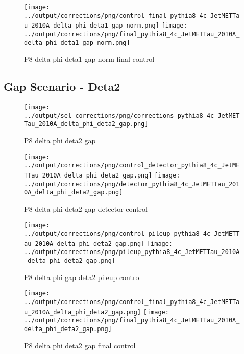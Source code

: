 \documentclass[11pt]{book}
\begin{document}
\begin{figure}[ht]
\centering
\texttt{[image: ../output/corrections/png/control\_final\_pythia8\_4c\_JetMETTau\_2010A\_delta\_phi\_deta1\_gap\_norm.png]}
\texttt{[image: ../output/corrections/png/final\_pythia8\_4c\_JetMETTau\_2010A\_delta\_phi\_deta1\_gap\_norm.png]}
\caption{P8 delta phi deta1 gap norm final control}
\label{fig:p8_JetMETTau_2010A_delta_phi_deta1_gap_norm_final_control}
\end{figure}


\clearpage
\subsection{Gap Scenario - Deta2}
\begin{figure}[ht]
\centering
\texttt{[image: ../output/sel\_corrections/png/corrections\_pythia8\_4c\_JetMETTau\_2010A\_delta\_phi\_deta2\_gap.png]}
\caption{P8 delta phi deta2 gap}
\label{fig:p8_JetMETTau_2010A_delta_phi_deta2_gap}
\end{figure}

\begin{figure}[ht]
\centering
\texttt{[image: ../output/corrections/png/control\_detector\_pythia8\_4c\_JetMETTau\_2010A\_delta\_phi\_deta2\_gap.png]}
\texttt{[image: ../output/corrections/png/detector\_pythia8\_4c\_JetMETTau\_2010A\_delta\_phi\_deta2\_gap.png]}
\caption{P8 delta phi deta2 gap detector control}
\label{fig:p8_JetMETTau_2010A_delta_phi_deta2_gap_detector_control}
\end{figure}

\begin{figure}[ht]
\centering
\texttt{[image: ../output/corrections/png/control\_pileup\_pythia8\_4c\_JetMETTau\_2010A\_delta\_phi\_deta2\_gap.png]}
\texttt{[image: ../output/corrections/png/pileup\_pythia8\_4c\_JetMETTau\_2010A\_delta\_phi\_deta2\_gap.png]}
\caption{P8 delta phi gap deta2 pileup control}
\label{fig:p8_JetMETTau_2010A_delta_phi_deta2_gap_pileup_control}
\end{figure}


\begin{figure}[ht]
\centering
\texttt{[image: ../output/corrections/png/control\_final\_pythia8\_4c\_JetMETTau\_2010A\_delta\_phi\_deta2\_gap.png]}
\texttt{[image: ../output/corrections/png/final\_pythia8\_4c\_JetMETTau\_2010A\_delta\_phi\_deta2\_gap.png]}
\caption{P8 delta phi deta2 gap final control}
\label{fig:p8_JetMETTau_2010A_delta_phi_deta2_gap_final_control}
\end{figure}
\end{document}
